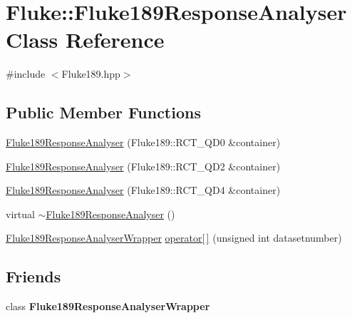 \hypertarget{classFluke_1_1Fluke189ResponseAnalyser}{
\section{Fluke::Fluke189ResponseAnalyser Class Reference}
\label{classFluke_1_1Fluke189ResponseAnalyser}
}


{\ttfamily \#include $<$Fluke189.hpp$>$}\subsection*{Public Member Functions}
\begin{DoxyCompactItemize}
\item 
\hyperlink{classFluke_1_1Fluke189ResponseAnalyser_af8443be8f2d94df431e9674ec8947ff1}{Fluke189ResponseAnalyser} (Fluke189::RCT\_\-QD0 \&container)
\item 
\hyperlink{classFluke_1_1Fluke189ResponseAnalyser_a7f0525c67c93abf3f4dd4523be858d2c}{Fluke189ResponseAnalyser} (Fluke189::RCT\_\-QD2 \&container)
\item 
\hyperlink{classFluke_1_1Fluke189ResponseAnalyser_aee4c6051258bc1f44659e15ea89df442}{Fluke189ResponseAnalyser} (Fluke189::RCT\_\-QD4 \&container)
\item 
virtual \hyperlink{classFluke_1_1Fluke189ResponseAnalyser_a1a09156357eb1fd675eeb875cadd8c5d}{$\sim$Fluke189ResponseAnalyser} ()
\item 
\hyperlink{classFluke_1_1Fluke189ResponseAnalyserWrapper}{Fluke189ResponseAnalyserWrapper} \hyperlink{classFluke_1_1Fluke189ResponseAnalyser_a45c800d717414e61975979c070416453}{operator\mbox{[}$\,$\mbox{]}} (unsigned int datasetnumber)
\end{DoxyCompactItemize}
\subsection*{Friends}
\begin{DoxyCompactItemize}
\item 
\hypertarget{classFluke_1_1Fluke189ResponseAnalyser_ae0579282f596c3f1ee4e3434e0a2f0bf}{
class {\bfseries Fluke189ResponseAnalyserWrapper}}
\label{classFluke_1_1Fluke189ResponseAnalyser_ae0579282f596c3f1ee4e3434e0a2f0bf}

\end{DoxyCompactItemize}


